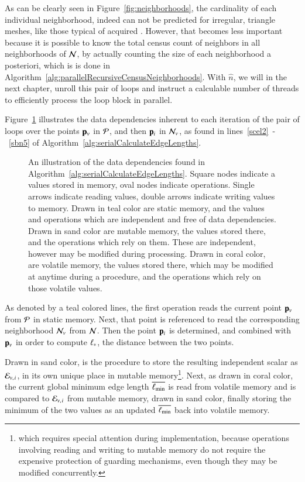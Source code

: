 As can be clearly seen in Figure~\ref{fig:neighborhoods}, the cardinality of each individual neighborhood, indeed can not be predicted for irregular, triangle meshes, like those typical of acquired \tdd{}. However, that becomes less important because it is possible to know the total census count of neighbors in all neighborhoods of $\mathcal{N}$, by actually counting the size of each neighborhood a posteriori, which is is done in Algorithm~\ref{alg:parallelRecursiveCensusNeighborhoods}. With $\hat{n}$, we will in the next chapter, unroll this pair of loops and instruct a calculable number of threads to efficiently process the loop block in parallel.

Figure~\ref{fig:sacelDataDependencies} illustrates the data dependencies inherent to each iteration of the pair of loops over the points $\mathbf{p}_v$ in $\mathcal{P}$, and then $\mathbf{p}_i$ in $\mathcal{N}_v$, as found in lines~\ref{scel2}~-~\ref{sbn5} of Algorithm~\ref{alg:serialCalculateEdgeLengths}.

\begin{figure}[ht]
	
	{\caption[Data Dependencies in Serial Algorithm~\ref{alg:serialCalculateEdgeLengths}: Calculate Edge Lengths]{An illustration of the data dependencies found in Algorithm~\ref{alg:serialCalculateEdgeLengths}. Square nodes indicate a values stored in memory, oval nodes indicate operations. Single arrows indicate reading values, double arrows indicate writing values to memory. Drawn in teal color are static memory, and the values and operations which are independent and free of data dependencies. Drawn in sand color are mutable memory, the values stored there, and the operations which rely on them. These are independent, however may be modified during processing. Drawn in coral color, are volatile memory, the values stored there, which may be modified at anytime during a procedure, and the operations which rely on those volatile values.}\label{fig:sacelDataDependencies}}
\end{figure}

As denoted by a teal colored lines, the first operation reads the current point $\mathbf{p}_v$ from $\mathcal{P}$ in static memory. Next, that point is referenced to read the corresponding neighborhood $\mathcal{N}_v$ from $\mathcal{N}$. Then the point $\mathbf{p}_i$ is determined, and combined with $\mathbf{p}_v$ in order to compute $\ell_\ast$, the distance between the two points.

Drawn in sand color, is the procedure to store the resulting independent scalar as $\mathcal{E}_{v,\kern.75pt i}$, in its own unique place in mutable memory\footnote{which requires special attention during implementation, because operations involving reading and writing to mutable memory do not require the expensive protection of guarding mechanisms, even though they may be modified concurrently.}. Next, as drawn in coral color, the current global minimum edge length $\overline{\ell_\text{min}}$ is read from volatile memory and is compared to $\mathcal{E}_{v,\kern.75pt i}$ from mutable memory, drawn in sand color, finally storing the minimum of the two values as an updated $\overline{\ell_\text{min}}$ back into volatile memory.

